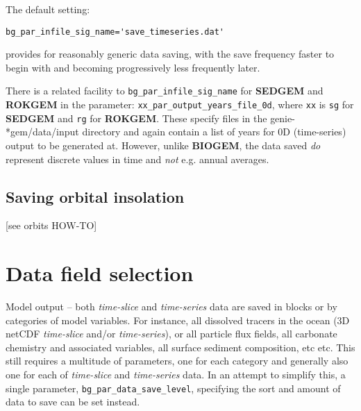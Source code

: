 \documentclass[11pt,fleqn]{book} %
\begin{document}
\vspace{1mm}
The default setting:
\vspace{-1mm}
\small\begin{verbatim}bg_par_infile_sig_name='save_timeseries.dat'\end{verbatim}\normalsize
\vspace{-1mm}
provides for reasonably generic data saving, with the save frequency faster to begin with and becoming progressively less frequently later.

There is a related facility to \texttt{bg\_par\_infile\_sig\_name} for \textbf{SEDGEM} and \textbf{ROKGEM} in the parameter: \texttt{xx\_par\_output\_years\_file\_0d}, where \texttt{xx} is \texttt{sg} for \textbf{SEDGEM} and \texttt{rg} for \textbf{ROKGEM}. These specify files in the \textsf{\footnotesize genie-*gem/data/input} directory and again contain a list of years for 0D (time-series) output to be generated at. However, unlike \textbf{BIOGEM}, the data saved \textit{do} represent discrete values in time and \textit{not} e.g. annual averages.


\subsection{Saving orbital insolation}

[see orbits HOW-TO]


\newpage


\section{Data field selection}

Model output -- both \textit{time-slice} and \textit{time-series} data are saved in blocks or  by categories of model variables. For instance, all dissolved tracers in the ocean (3D netCDF \textit{time-slice} and/or \textit{time-series}), or all particle flux fields, all carbonate chemistry and associated variables, all surface sediment composition, etc etc. This still requires a multitude of parameters, one for each category and generally also one for each of \textit{time-slice} and \textit{time-series} data. In an attempt to simplify this, a single parameter, \texttt{bg\_par\_data\_save\_level}, specifying the sort and amount of data to save can be set instead.
\end{document}
